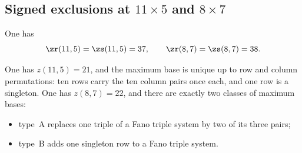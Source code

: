 \subsection{Signed exclusions at \texorpdfstring{$11\times5$}{11x5} and \texorpdfstring{$8\times7$}{8x7}}\label{sec:signed-exclusions}

\begin{theorem}\label{thm:signed-exclusions}
One has
\[
 \zr(11,5)=\zs(11,5)=37,\qquad \zr(8,7)=\zs(8,7)=38 .
\]
\end{theorem}

\begin{lemma}\label{lem:bases-11-5-8-7}
One has $z(11,5)=21$, and the maximum base is unique up to row and
column permutations: ten rows carry the ten column pairs once each, and
one row is a singleton.
One has $z(8,7)=22$, and there are exactly two classes of maximum bases:
\begin{itemize}
\item type~A replaces one triple of a Fano triple system by two of its
      three pairs;
\item type~B adds one singleton row to a Fano triple system.
\end{itemize}
\end{lemma}

